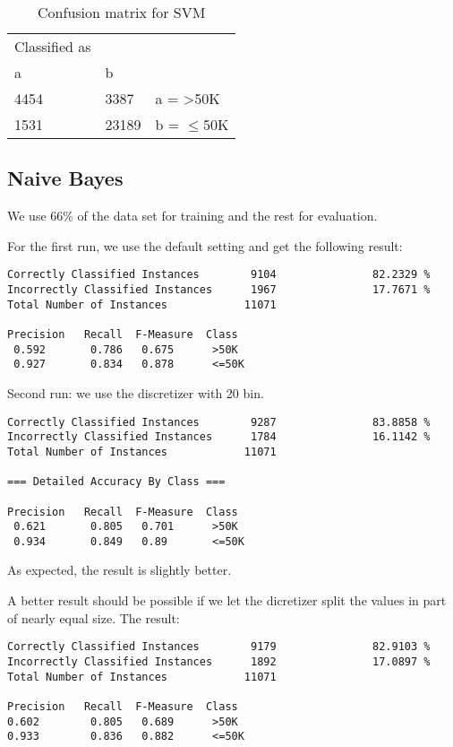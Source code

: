 \documentclass[paper=a4, fontsize=11pt]{scrartcl} %
\numberwithin{equation}{section} %
\numberwithin{figure}{section} %
\numberwithin{table}{section} %
\begin{document}
\vspace{6pt}

\begin{table}[h]
\centering
\begin{tabular}{|lll|}
	\hline
	Classified as	& &\\
	a		&	b & \\
	\hline
	4454   	& 3387  	&  a = >50K\\
  1531   	& 23189 	&  b = $\leq$50K\\
  \hline
\end{tabular}
\caption{Confusion matrix for SVM}
\end{table}

\subsection{Naive Bayes}

We use 66\% of the data set for training and the rest for evaluation.

For the first run, we use the default setting and get the following result:

\begin{verbatim}
Correctly Classified Instances        9104               82.2329 %
Incorrectly Classified Instances      1967               17.7671 %
Total Number of Instances            11071     

Precision   Recall  F-Measure  Class
 0.592       0.786   0.675      >50K
 0.927       0.834   0.878      <=50K
\end{verbatim}

Second run: we use the discretizer with 20 bin.

\begin{verbatim}
Correctly Classified Instances        9287               83.8858 %
Incorrectly Classified Instances      1784               16.1142 %
Total Number of Instances            11071     

=== Detailed Accuracy By Class ===

Precision   Recall  F-Measure  Class
 0.621       0.805   0.701      >50K
 0.934       0.849   0.89       <=50K
\end{verbatim}

As expected, the result is slightly better.

A better result should be possible if we let the dicretizer split the values in part of nearly equal size. The result:

\begin{verbatim}
Correctly Classified Instances        9179               82.9103 %
Incorrectly Classified Instances      1892               17.0897 %
Total Number of Instances            11071     

Precision   Recall  F-Measure  Class
0.602        0.805   0.689      >50K
0.933        0.836   0.882      <=50K
\end{verbatim}
\end{document}
